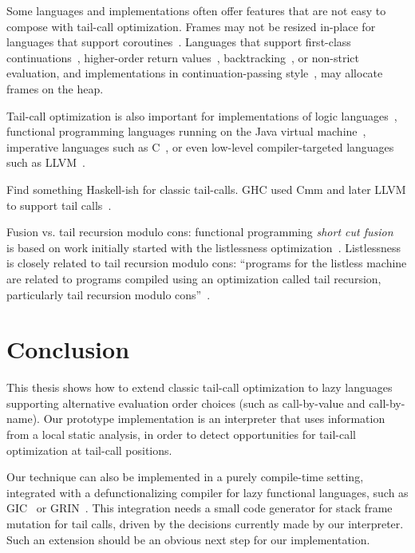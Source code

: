 \documentclass[diploma]{softlab-thesis}
\begin{document}
Some languages and implementations often offer features that are not
easy to compose with tail-call optimization. Frames may
not be resized in-place for languages that support
coroutines~\cite[p.~60]{Waite84}. Languages that support first-class
continuations~\cite{Sperber10}, higher-order return
values~\cite[p.~103]{Appel92}\cite{Steele78},
backtracking~\cite{Bobrow73}, or non-strict evaluation, and
implementations in continuation-passing style~\cite[p.~103]{Appel92},
may allocate frames on the heap. 

Tail-call optimization is also important for implementations of logic languages~\cite{Bigot99},
functional programming languages running on the Java virtual machine~\cite{Madsen:2018:TCE:3178372.3179499},
imperative languages such as C~\cite{baueran:mthesis:2003,Probst01}, or even low-level compiler-targeted languages such as
LLVM~\cite{Pandey:2015:LC:2842773}.

Find something Haskell-ish for classic tail-calls. GHC used Cmm and 
later LLVM to support tail calls~\cite{Terei:2010:LBG:1863523.1863538}.

Fusion vs. tail recursion modulo cons: functional programming \emph{short cut fusion}~\cite{Gill:1993:SCD:165180.165214,Pardo16} is based on work initially started with the listlessness optimization~\cite{Wadler84}. Listlessness is closely related to tail recursion modulo cons: ``programs for the listless machine are related to programs compiled using an optimization called tail recursion, particularly tail recursion modulo cons''~\cite{Wadler84}.


\chapter{Conclusion}
\label{ch:conclusion}


This thesis shows how to extend classic tail-call optimization to lazy
languages supporting alternative evaluation order choices (such as
call-by-value and call-by-name). Our prototype implementation is an
interpreter that uses information from a local static analysis, in
order to detect opportunities for tail-call optimization at tail-call
positions.

Our technique can also be implemented in a purely compile-time
setting, integrated with a defunctionalizing compiler for lazy
functional languages, such as GIC~\cite{Fourtounis14} or
GRIN~\cite{Boquist96,Podlovics19}.  This integration needs a small
code generator for stack frame mutation for tail calls, driven by the
decisions currently made by our interpreter. Such an extension should
be an obvious next step for our implementation.
\end{document}
